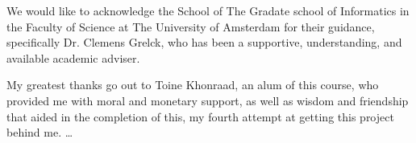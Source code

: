 \begin{acknowledgements}
    \addchaptertocentry{\acknowledgementname}
    We would like to acknowledge the School of The Gradate school of Informatics in the Faculty of Science at The University of Amsterdam for their guidance, specifically Dr. Clemens Grelck, who has been a supportive, understanding, and available academic adviser.
    
    My greatest thanks go out to Toine Khonraad, an alum of this course, who provided me with moral and monetary support, as well as wisdom and friendship that aided in the completion of this, my fourth attempt at getting this project behind me. 
    \ldots
\end{acknowledgements}